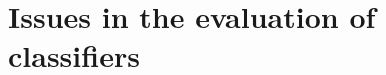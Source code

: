 \documentclass[\ifafour a4paper,12pt,\else a5paper,10pt,\fi%
onecolumn,oneside,article,%
british%
]{memoir}
\theoremstyle{remark}
\theoremstyle{innote}
\renewcommand*{\|}[1][]{\nonscript\:#1\vert\nonscript\:\mathopen{}}
\begin{document}
\begin{quotation}


\end{quotation}

\section{Issues in the evaluation of classifiers}
\label{sec:issues}
\end{document}
